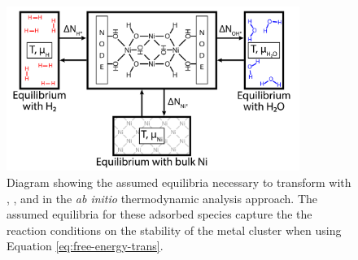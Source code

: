 \documentclass[12pt]{article}
\begin{document}
\begin{figure}[H]
    \centering
    \includegraphics[width=0.85\textwidth]{zi-images/00-General-Graphics/FPT-schematic-full.png}
    \caption{Diagram showing the assumed equilibria necessary to transform with , , and  in the \textit{ab initio} thermodynamic analysis approach. The assumed equilibria for these adsorbed species capture the the reaction conditions on the stability of the metal cluster when using Equation \ref{eq:free-energy-trans}.}
    \label{fig:FPT-process}
\end{figure}
\end{document}
